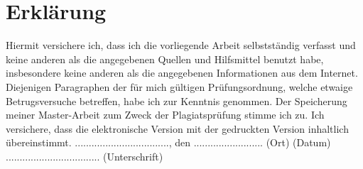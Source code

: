 \documentclass[
        ngerman,
        paper=a4,
        numbers=noendperiod,
]{scrreprt}
\begin{document}
\clearpage
        
        
        




\chapter*{Erklärung}
Hiermit versichere ich, dass ich die vorliegende Arbeit selbstständig verfasst und keine anderen als die angegebenen Quellen und Hilfsmittel benutzt habe, insbesondere keine anderen als die angegebenen Informationen aus dem Internet. Diejenigen Paragraphen der für mich gültigen Prüfungsordnung, welche etwaige Betrugsversuche betreffen, habe ich zur Kenntnis genommen. Der Speicherung meiner Master-Arbeit zum Zweck der Plagiatsprüfung stimme ich zu. Ich versichere, dass die elektronische Version mit der gedruckten Version inhaltlich übereinstimmt.\newline
\linebreak
\linebreak
\linebreak
.................................., den .........................\newline
(Ort) (Datum)\newline
\linebreak
\linebreak
\linebreak
..................................\newline
(Unterschrift)
\end{document}
